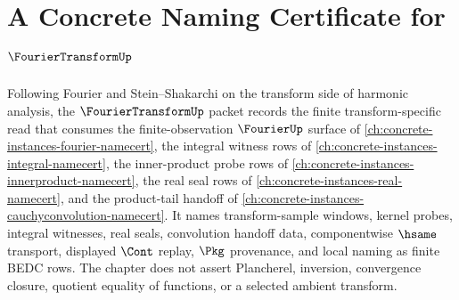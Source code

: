 \chapter{A Concrete Naming Certificate for $\FourierTransformUp$}
\label{ch:concrete-instances-fourier-transform-namecert}

Following Fourier and Stein--Shakarchi on the transform side of harmonic analysis, the $\FourierTransformUp$ packet records the finite transform-specific read that consumes the finite-observation $\FourierUp$ surface of \autoref{ch:concrete-instances-fourier-namecert}, the integral witness rows of \autoref{ch:concrete-instances-integral-namecert}, the inner-product probe rows of \autoref{ch:concrete-instances-innerproduct-namecert}, the real seal rows of \autoref{ch:concrete-instances-real-namecert}, and the product-tail handoff of \autoref{ch:concrete-instances-cauchyconvolution-namecert}. It names transform-sample windows, kernel probes, integral witnesses, real seals, convolution handoff data, componentwise $\hsame$ transport, displayed $\Cont$ replay, $\Pkg$ provenance, and local naming as finite BEDC rows. The chapter does not assert Plancherel, inversion, convergence closure, quotient equality of functions, or a selected ambient transform.

